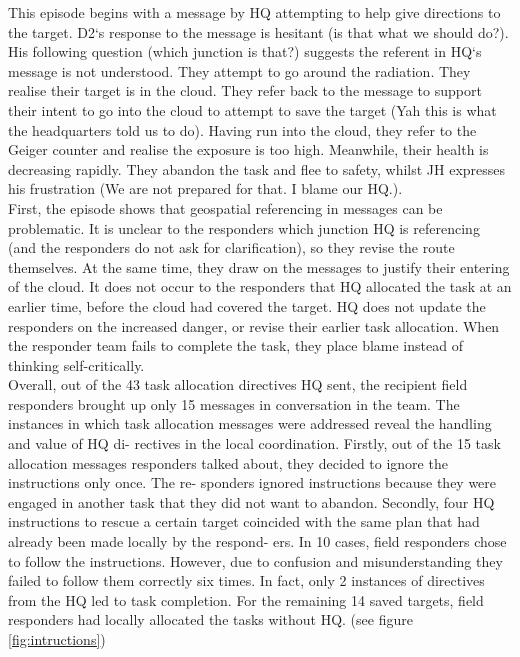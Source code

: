 This episode begins with a message by HQ attempting to help give directions to the target. D2`s response to the message is hesitant (is that what we should do?). His following question (which junction is that?) suggests the referent in HQ`s message is not understood. They attempt to go around the radiation. They realise their target is in the cloud. They refer back to the message to support their intent to go into the cloud to attempt to save the target (Yah this is what the headquarters told us to do). Having run into the cloud, they refer to the Geiger counter and realise the exposure is too high. Meanwhile, their health is decreasing rapidly. They abandon the task and flee to safety, whilst JH expresses his frustration (We are not prepared for that. I blame our HQ.).\\

First, the episode shows that geospatial referencing in messages can be problematic. It is unclear to the responders which junction HQ is referencing (and the responders do not ask for clarification), so they revise the route themselves. At the same time, they draw on the messages to justify their entering of the cloud. It does not occur to the responders that HQ allocated the task at an earlier time, before the cloud had covered the target. HQ does not update the responders on the increased danger, or revise their earlier task allocation. When the responder team fails to complete the task, they place blame instead of thinking self-critically.\\

Overall, out of the 43 task allocation directives HQ sent, the recipient field responders brought up only 15 messages in conversation in the team. The instances in which task allocation messages were addressed reveal the handling and value of HQ di- rectives in the local coordination. Firstly, out of the 15 task allocation messages responders talked about, they decided to ignore the instructions only once. The re- sponders ignored instructions because they were engaged in another task that they did not want to abandon. Secondly, four HQ instructions to rescue a certain target coincided with the same plan that had already been made locally by the respond- ers. In 10 cases, field responders chose to follow the instructions. However, due to confusion and misunderstanding they failed to follow them correctly six times. In fact, only 2 instances of directives from the HQ led to task completion. For the remaining 14 saved targets, field responders had locally allocated the tasks without HQ. (see figure \ref{fig:intructions})\\

